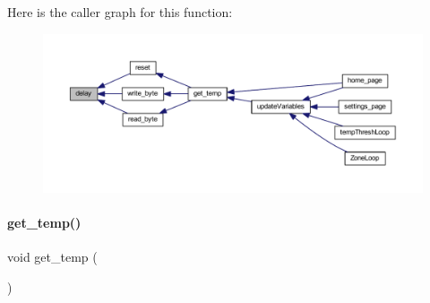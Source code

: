 Here is the caller graph for this function\+:
\nopagebreak
\begin{figure}[H]
\begin{center}
\leavevmode
\includegraphics[width=350pt]{a00047_a0bdd09d004d02b67ac952b8da05e8115_icgraph}
\end{center}
\end{figure}
\mbox{\label{a00047_a7c1c39f9031c3ab344bbd9fa8a85479e}} 
\paragraph{get\+\_\+temp()}
{\footnotesize\ttfamily void get\+\_\+temp (\begin{DoxyParamCaption}{ }\end{DoxyParamCaption})}

